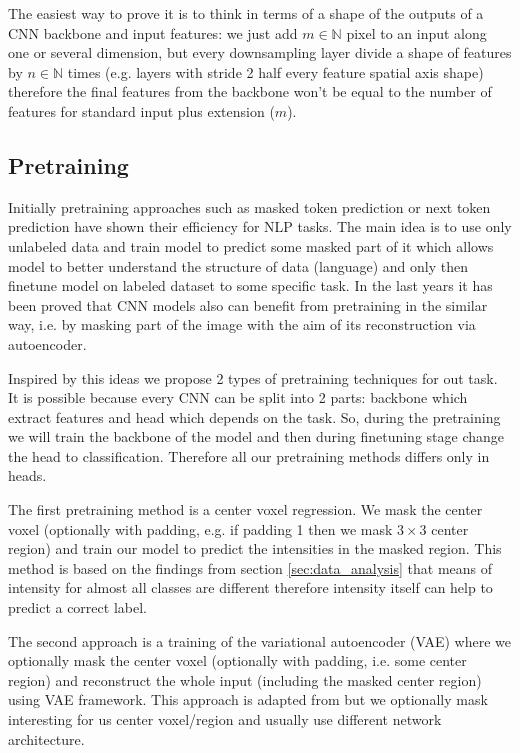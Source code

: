 \documentclass[twocolumn, a4paper]{article}
\theoremstyle{definition}
\begin{document}
The easiest way to prove it is to think in terms of a shape of the outputs of a CNN backbone and input features:
we just add \( m \in \mathbb{N} \) pixel to an input along one or several dimension, but every downsampling layer divide a
shape of features by \( n \in \mathbb{N} \) times (e.g. layers with stride 2 half every feature spatial axis shape)
therefore the final features from the backbone won't be equal to the number of features for standard input plus extension (\(m\)).

\subsection{Pretraining}
Initially pretraining approaches such as masked token prediction \cite{devlin2018bert}
or next token prediction \cite{radford2019language}
have shown their efficiency for NLP tasks. The main idea is to use only
unlabeled data and train model to predict some masked part of it which allows model
to better understand the structure of data (language) and only then finetune model on labeled
dataset to some specific task.
In the last years it has been proved \cite{woo2023convnext} that CNN models also can benefit from
pretraining in the similar way, i.e. by masking part of the image with the aim
of its reconstruction via autoencoder.

Inspired by this ideas we propose 2 types of pretraining techniques for out task.
It is possible because every CNN can be split into 2 parts: backbone which extract
features and head which depends on the task. So, during the pretraining we will train
the backbone of the model and then during finetuning stage change the head to classification.
Therefore all our pretraining methods differs only in heads.

The first pretraining method is a center voxel regression. We mask the center voxel
(optionally with padding, e.g. if padding 1 then we mask \( 3 \times 3 \) center region)
and train our model to predict the intensities in the masked region. This method is based
on the findings from section \ref{sec:data_analysis} that means of intensity for almost all classes are different therefore intensity itself
can help to predict a correct label.

The second approach is a training of the variational autoencoder (VAE) \cite{kingma2013auto} where we
optionally mask the center voxel (optionally with padding, i.e. some center region) and reconstruct the whole input (including the masked
center region) using VAE framework. This approach is adapted from \cite{woo2023convnext} but we
optionally mask interesting for us center voxel/region and usually use different network architecture.
\end{document}
